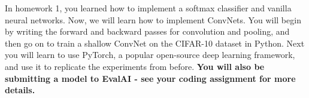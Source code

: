 
In homework 1, you learned how to implement a softmax classifier and vanilla neural networks. Now, we will learn how to implement ConvNets. You will begin by writing the forward and backward
passes for convolution and pooling, and then go on to train a shallow ConvNet on the CIFAR-10 dataset in Python. Next you will learn to use PyTorch, a popular open-source deep learning framework, and use it to replicate the experiments from before. \textbf{You will also be submitting a model to EvalAI - see your coding assignment for more details.}

